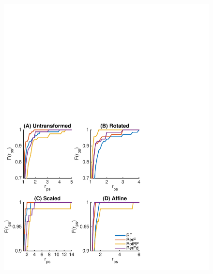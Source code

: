 \documentclass{article} %
\begin{document}
\begin{figure}[h]
\begin{center}
\includegraphics[trim=0in 0in 0in 0in, clip=true, width=\linewidth]{../Figures/pdf/Fig4_benchmark}
\end{center}
\caption{}
\label{fig:benchmark}
\end{figure}




\clearpage
\end{document}
